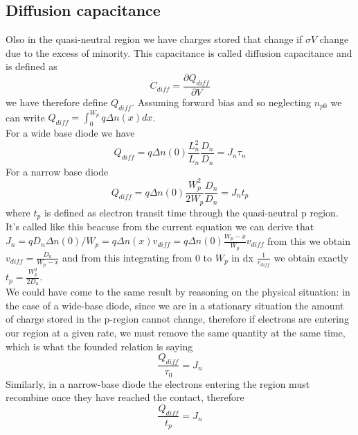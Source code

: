\subsection{Diffusion capacitance}
Olso in the quasi-neutral region we have charges stored that change if $\sigma V$ change due to the excess of minority. This capacitance is called diffusion capacitance and is defined as 
\begin{equation}
C_{diff}=\frac{\partial Q_{diff}}{\partial V}
\end{equation} 
we have therefore define $Q_{diff}$. Assuming forward bias and so neglecting $n_{p0}$ we can write $Q_{diff}=\int^{W_p}_0 q\Delta n(x) dx$.\\
For a wide base diode we have 
\begin{equation}
Q_{diff}=q\Delta n(0) \frac{L_n^2}{L_n}\frac{D_n}{D_n}=J_n\tau_n
\end{equation}
For a narrow base diode 
\begin{equation}
Q_{diff}=q\Delta n(0) \frac{W_p^2}{2W_p}\frac{D_n}{D_n}=J_nt_p
\end{equation}
where $t_p$ is defined as electron transit time through the quasi-neutral p region.\\

It's called like this beacuse from the current equation we can derive that $J_n=qD_n\Delta n(0)/W_p=q\Delta n(x) v_{diff}=q\Delta n(0)\frac{W_p-x}{W_p} v_{diff}$ from this we obtain $v_{diff}=\frac{D_n}{W_p-x}$ and from this integrating from 0 to $W_p$ in dx $\frac{1}{v_{diff}}$ we obtain exactly $t_p=\frac{W_p^2}{2D_n}$.\\

We could have come to the same result by reasoning on the physical situation: in the case of a wide-base diode, since we are in a stationary situation the amount of charge stored in the p-region cannot change, therefore if electrons are entering our region at a given rate, we must remove the same quantity at the same time, which is what the founded relation is saying
\begin{equation}
\frac{Q_{diff}}{\tau_0}=J_n
\end{equation}
Similarly, in a narrow-base diode the electrons entering the region must
recombine once they have reached the contact, therefore
\begin{equation}
\frac{Q_{diff}}{t_p}=J_n
\end{equation}
\vspace{5mm}\\

